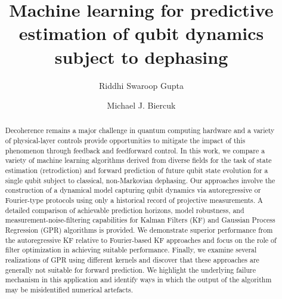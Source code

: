 
\title{Machine learning for predictive estimation of qubit dynamics subject to dephasing}

\author{Riddhi Swaroop Gupta} 

\author{Michael J. Biercuk}

\begin{abstract}
Decoherence remains a major challenge in quantum computing hardware and a variety of physical-layer controls provide opportunities to mitigate the impact of this phenomenon through feedback and feedforward control. In this work, we compare a variety of machine learning algorithms derived from diverse fields for the task of state estimation (retrodiction) and forward prediction of future qubit state evolution for a single qubit subject to classical, non-Markovian dephasing. Our approaches involve the construction of a dynamical model capturing qubit dynamics via autoregressive or Fourier-type protocols using only a historical record of projective measurements.  A detailed comparison of achievable prediction horizons, model robustness, and measurement-noise-filtering capabilities for Kalman Filters (KF) and Gaussian Process Regression (GPR) algorithms is provided. We demonstrate superior performance from the autoregressive KF relative to Fourier-based KF approaches and focus on the role of filter optimization in achieving suitable performance. Finally, we examine several realizations of GPR using different kernels and discover that these approaches are generally not suitable for forward prediction.  We highlight the underlying failure mechanism in this application and identify ways in which the output of the algorithm may be misidentified numerical artefacts.
\end{abstract}

\maketitle
